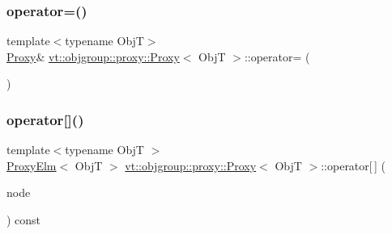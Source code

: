 \mbox{\label{structvt_1_1objgroup_1_1proxy_1_1_proxy_a2fb8dafa11b8c8f70888118bdc2f1b60}} 
\subsubsection{\texorpdfstring{operator=()}{operator=()}}
{\footnotesize\ttfamily template$<$typename ObjT$>$ \\
\hyperlink{structvt_1_1objgroup_1_1proxy_1_1_proxy}{Proxy}\& \hyperlink{structvt_1_1objgroup_1_1proxy_1_1_proxy}{vt\+::objgroup\+::proxy\+::\+Proxy}$<$ ObjT $>$\+::operator= (\begin{DoxyParamCaption}\item[{\hyperlink{structvt_1_1objgroup_1_1proxy_1_1_proxy}{Proxy}$<$ ObjT $>$ const \&}]{ }\end{DoxyParamCaption})\hspace{0.3cm}{\ttfamily [default]}}

\mbox{\label{structvt_1_1objgroup_1_1proxy_1_1_proxy_a00a267a8730fe2547776ff0136ea3895}} 
\subsubsection{\texorpdfstring{operator[]()}{operator[]()}}
{\footnotesize\ttfamily template$<$typename ObjT $>$ \\
\hyperlink{structvt_1_1objgroup_1_1proxy_1_1_proxy_elm}{Proxy\+Elm}$<$ ObjT $>$ \hyperlink{structvt_1_1objgroup_1_1proxy_1_1_proxy}{vt\+::objgroup\+::proxy\+::\+Proxy}$<$ ObjT $>$\+::operator\mbox{[}$\,$\mbox{]} (\begin{DoxyParamCaption}\item[{\hyperlink{namespacevt_a866da9d0efc19c0a1ce79e9e492f47e2}{Node\+Type}}]{node }\end{DoxyParamCaption}) const}

\mbox{\label{structvt_1_1objgroup_1_1proxy_1_1_proxy_addf812b8ec24f570f3796c78adc7b18d}} 
